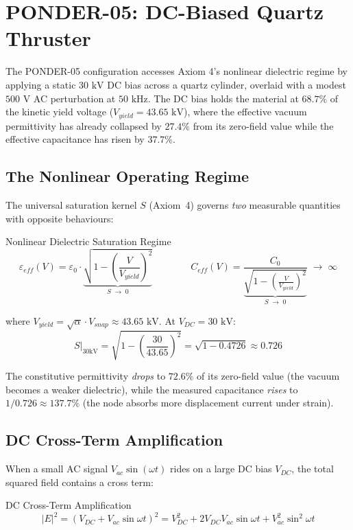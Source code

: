 \chapter{PONDER-05: DC-Biased Quartz Thruster}
\label{ch:ponder_05}

The PONDER-05 configuration accesses Axiom 4's nonlinear dielectric regime by applying a static $30\text{ kV}$ DC bias across a quartz cylinder, overlaid with a modest $500\text{ V}$ AC perturbation at $50\text{ kHz}$. The DC bias holds the material at $68.7\%$ of the kinetic yield voltage ($V_{yield} = 43.65\text{ kV}$), where the effective vacuum permittivity has already collapsed by $27.4\%$ from its zero-field value while the effective capacitance has risen by $37.7\%$.

\section{The Nonlinear Operating Regime}

The universal saturation kernel $S$ (Axiom~4) governs \emph{two} measurable quantities with opposite behaviours:
\begin{resultbox}{Nonlinear Dielectric Saturation Regime}
\begin{equation}
    \varepsilon_{eff}(V) = \varepsilon_0 \cdot \underbrace{\sqrt{1 - \left(\frac{V}{V_{yield}}\right)^{\!2}}}_{S \;\to\; 0}
    \qquad\qquad
    C_{eff}(V) = \frac{C_0}{\underbrace{\sqrt{1 - \left(\frac{V}{V_{yield}}\right)^{\!2}}}_{S \;\to\; 0}} \;\to\; \infty
\end{equation}
\end{resultbox}
where $V_{yield} = \sqrt{\alpha} \cdot V_{snap} \approx 43.65\text{ kV}$. At $V_{DC} = 30\text{ kV}$:
\begin{equation}
    S\big|_{30\text{kV}} = \sqrt{1 - \left(\frac{30}{43.65}\right)^{\!2}} = \sqrt{1 - 0.4726} \approx 0.726
\end{equation}

The constitutive permittivity \emph{drops} to $72.6\%$ of its zero-field value (the vacuum becomes a weaker dielectric), while the measured capacitance \emph{rises} to $1/0.726 \approx 137.7\%$ (the node absorbs more displacement current under strain).

\section{DC Cross-Term Amplification}

When a small AC signal $V_{ac}\sin(\omega t)$ rides on a large DC bias $V_{DC}$, the total squared field contains a cross term:
\begin{resultbox}{DC Cross-Term Amplification}
\begin{equation}
    |E|^2 = (V_{DC} + V_{ac}\sin\omega t)^2 = V_{DC}^2 + 2V_{DC}V_{ac}\sin\omega t + V_{ac}^2\sin^2\omega t
\end{equation}
\end{resultbox}

